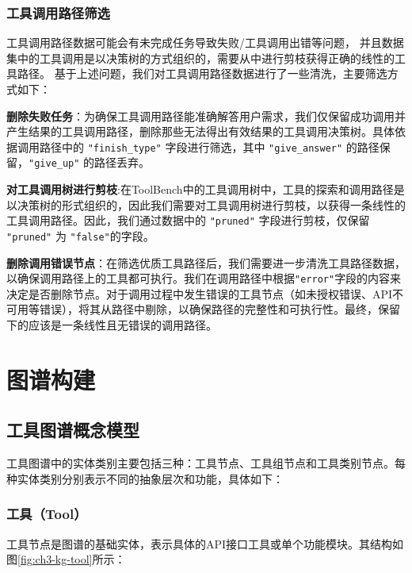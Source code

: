 \subsubsection{工具调用路径筛选}

工具调用路径数据可能会有未完成任务导致失败/工具调用出错等问题，
并且数据集中的工具调用是以决策树的方式组织的，需要从中进行剪枝获得正确的线性的工具路径。
基于上述问题，我们对工具调用路径数据进行了一些清洗，主要筛选方式如下：

\textbf{删除失败任务}：为确保工具调用路径能准确解答用户需求，我们仅保留成功调用并产生结果的工具调用路径，删除那些无法得出有效结果的工具调用决策树。具体依据调用路径中的 \texttt{"finish\_type"} 字段进行筛选，其中 \texttt{"give\_answer"} 的路径保留，\texttt{"give\_up"} 的路径丢弃。

\textbf{对工具调用树进行剪枝}:在ToolBench中的工具调用树中，工具的探索和调用路径是以决策树的形式组织的，因此我们需要对工具调用树进行剪枝，以获得一条线性的工具调用路径。因此，我们通过数据中的 \texttt{"pruned"} 字段进行剪枝，仅保留 \texttt{"pruned"} 为 \texttt{"false"}的字段。

\textbf{删除调用错误节点}：在筛选优质工具路径后，我们需要进一步清洗工具路径数据，以确保调用路径上的工具都可执行。我们在调用路径中根据\texttt{"error"}字段的内容来决定是否删除节点。对于调用过程中发生错误的工具节点（如未授权错误、API不可用等错误），将其从路径中剔除，以确保路径的完整性和可执行性。最终，保留下的应该是一条线性且无错误的调用路径。


\section{图谱构建}

\subsection{工具图谱概念模型}

工具图谱中的实体类别主要包括三种：工具节点、工具组节点和工具类别节点。每种实体类别分别表示不同的抽象层次和功能，具体如下：


\subsubsection{工具（Tool）}

工具节点是图谱的基础实体，表示具体的API接口工具或单个功能模块。其结构如图\ref{fig:ch3-kg-tool}所示：

